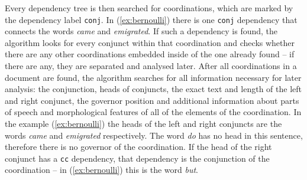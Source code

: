 Every dependency tree is then searched for coordinations, which are marked by the dependency label \texttt{conj}. In (\ref{ex:bernoulli}) there is one \texttt{conj} dependency that connects the words \textsl{came} and \textsl{emigrated}. If such a dependency is found, the algorithm looks for every conjunct within that coordination and checks whether there are any other coordinations embedded inside of the one already found -- if there are any, they are separated and analysed later. After all coordinations in a document are found, the algorithm searches for all information necessary for later analysis: the conjunction, heads of conjuncts, the exact text and length of the left and right conjunct, the governor position and additional information about parts of speech and morphological features of all of the elements of the coordination. In the example (\ref{ex:bernoulli}) the heads of the left and right conjuncts are the words \textsl{came} and \textsl{emigrated} respectively. The word \textsl{do} has no head in this sentence, therefore there is no governor of the coordination. If the head of the right conjunct has a \texttt{cc} dependency, that dependency is the conjunction of the coordination -- in (\ref{ex:bernoulli}) this is the word \textsl{but}. 

